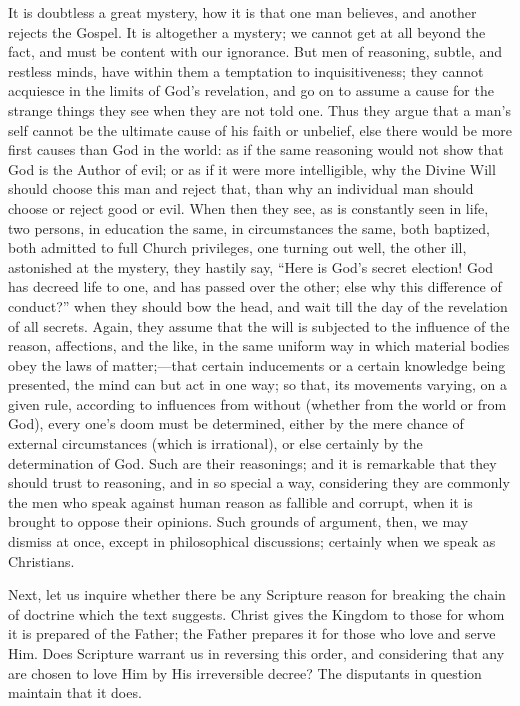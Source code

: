 It is doubtless a great mystery, how it is that one man believes, and
another rejects the Gospel. It is altogether a mystery; we cannot get at
all beyond the fact, and must be content with our ignorance. But men of
reasoning, subtle, and restless minds, have within them a temptation to
inquisitiveness; they cannot acquiesce in the limits of God's
revelation, and go on to assume a cause for the strange things they see
when they are not told one. Thus they argue that a man's self cannot be
the ultimate cause of his faith or unbelief, else there would be more
first causes than God in the world: as if the same reasoning would not
show that God is the Author of evil; or as if it were more intelligible,
why the Divine Will should choose this man and reject that, than why an
individual man should choose or reject good or evil. When then they see,
as is constantly seen in life, two persons, in education the same, in
circumstances the same, both baptized, both admitted to full Church
privileges, one turning out well, the other ill, astonished at the
mystery, they hastily say, ``Here is God's secret election! God has
decreed life to one, and has passed over the other; else why this
difference of conduct?'' when they should bow the head, and wait
till the day of the revelation of all secrets. Again, they assume that
the will is subjected to the influence of the reason, affections, and
the like, in the same uniform way in which material bodies obey the laws
of matter;—that certain inducements or a certain knowledge being
presented, the mind can but act in one way; so that, its movements
varying, on a given rule, according to influences from without (whether
from the world or from God), every one's doom must be determined, either
by the mere chance of external circumstances (which is irrational), or
else certainly by the determination of God. Such are their reasonings;
and it is remarkable that they should trust to reasoning, and in so
special a way, considering they are commonly the men who speak against
human reason as fallible and corrupt, when it is brought to oppose their
opinions. Such grounds of argument, then, we may dismiss at once, except
in philosophical discussions; certainly when we speak as Christians.

Next, let us inquire whether there be any Scripture reason for
breaking the chain of doctrine which the text suggests. Christ gives the
Kingdom to those for whom it is prepared of the Father; the Father
prepares it for those who love and serve Him. Does Scripture warrant us
in reversing this order, and considering that any are chosen to love Him
by His irreversible decree? The disputants in question maintain that it
does.

